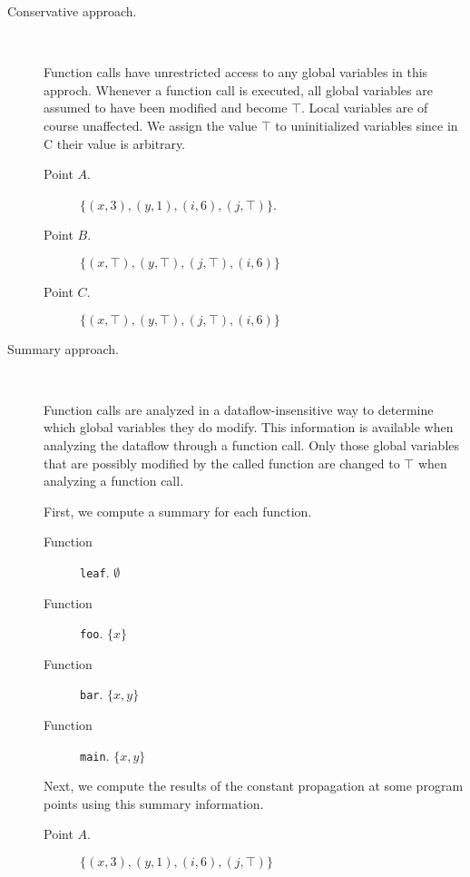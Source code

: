 \documentclass[letterpaper,11pt]{article}
\newcommand{\codesnip}{\texttt}
\begin{document}
\begin{description}
  \item[Conservative approach.] ~

    Function calls have unrestricted access to any global variables in this
    approch. Whenever a function call is executed, all global variables are
    assumed to have been modified and become $\top$. Local variables are of
    course unaffected. We assign the value $\top$ to uninitialized variables
    since in C their value is arbitrary.

    \begin{description}
      \item[Point $A$.]
        $\{ (x, 3), (y, 1), (i, 6), (j, \top)\}$.

      \item[Point $B$.]
        $\{ (x, \top), (y, \top), (j, \top), (i, 6) \}$

      \item[Point $C$.]
        $\{ (x, \top), (y, \top), (j, \top), (i, 6) \}$
    \end{description}

  \item[Summary approach.] ~

    Function calls are analyzed in a dataflow-insensitive way to determine
    which global variables they do modify. This information is available when
    analyzing the dataflow through a function call. Only those global variables
    that are possibly modified by the called function are changed to $\top$
    when analyzing a function call.

    First, we compute a summary for each function.

    \begin{description}
      \item[Function] \codesnip{leaf}.  $\emptyset$
      \item[Function] \codesnip{foo}. $\{ x \}$
      \item[Function] \codesnip{bar}. $\{ x, y \}$
      \item[Function] \codesnip{main}. $\{ x, y \}$
    \end{description}

    Next, we compute the results of the constant propagation at some program
    points using this summary information.

    \begin{description}
      \item[Point $A$.]
        $\{ (x, 3), (y, 1), (i, 6), (j, \top) \}$


\end{description}
\end{description}
\end{document}
